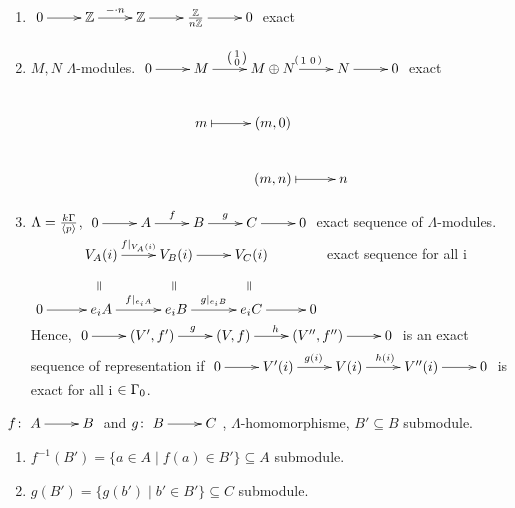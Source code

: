 \begin{exam}
	\begin{enumerate}[(1)]
		\item  $\xymatrix{0 \ar[r] & \mathbb{Z}\ar[r]^{-\cdot n} & \mathbb{Z}\ar[r] & \frac{\mathbb{Z}}{n\mathbb{Z}} \ar[r] & 0}$ exact
		\item $M, N$ $\Lambda$-modules.
		$\xymatrix
		{0\ar[r] & M\ar[r]^{\left(\begin{smallmatrix} 1 \\ 0 \end{smallmatrix}\right)} & M\oplus N\ar[r]^{\left(\begin{smallmatrix} 1 & 0 \end{smallmatrix}\right)} & N\ar[r] & 0 \\
			  & m \ar@{|->}[r]& (m,0) \\
			  &   & (m,n) \ar@{|->}[r]    & n\\
		}$ exact
	\item $\Lambda = \frac{k\Gamma}{\langle p \rangle}$, $\xymatrix{0 \ar[r] & A\ar[r]^f & B\ar[r]^g & C \ar[r] & 0}$ exact sequence of $\Lambda$-modules.
	$\xymatrix
	{
		 & V_A(i)\ar@{}[d]|-*[@]{=} \ar[r]^{f\vert_{V_A(i)}} & V_B(i)\ar@{}[d]|-*[@]{=} \ar[r]& V_C(i)\ar@{}[d]|-*[@]{=} & \\
		0\ar[r]& e_iA \ar[r]^{f\vert_{e_iA}}  & e_iB  \ar[r]^{g\vert_{e_iB}}  & e_iC \ar[r]  & 0\\
	}$ exact sequence for all i\\
Hence, 	$\xymatrix{0 \ar[r] & (V',f')\ar[r]^g & (V,f)\ar[r]^h & (V'',f'') \ar[r] & 0}$ is an exact sequence of representation if $\xymatrix{0 \ar[r] & V'(i)\ar[r]^{g(i)} & V(i)\ar[r]^{h(i)} & V''(i) \ar[r] & 0}$ is exact for all i $\in\Gamma_0$.
	
	\end{enumerate}
\end{exam}

\begin{exer}
		$f\colon\xymatrix{A\ar[r] & B}$ and $g\colon\xymatrix{B\ar[r] & C}$, $\Lambda$-homomorphisme, $B' \subseteq B$ submodule.
		\begin{enumerate}[(1)]
			\item $f^{-1}(B')= \{ a\in A\mid f(a)\in B'\}\subseteq A$ submodule.
			\item $g(B')= \{ g(b')\mid b'\in B'\}\subseteq C$ submodule.
		\end{enumerate}
\end{exer}

